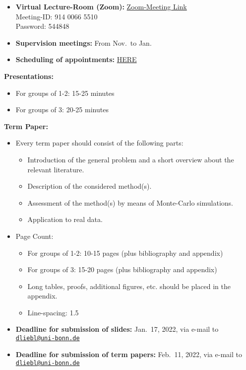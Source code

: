 \documentclass[
]{book}
\providecommand{\tightlist}{%
  \setlength{\itemsep}{0pt}\setlength{\parskip}{0pt}}
\begin{document}
\begin{itemize}
\item
  \textbf{Virtual Lecture-Room (Zoom):} \href{https://uni-bonn.zoom.us/j/91400665510?pwd=RUl5NW9mMjcyQlk2VkRGbXFrSmJlQT09}{Zoom-Meeting Link}\\
  Meeting-ID: 914 0066 5510\\
  Password: 544848
\item
  \textbf{Supervision meetings:} From Nov.~to Jan.~
\item
  \textbf{Scheduling of appointments:} \href{https://docs.google.com/spreadsheets/d/1clb0ple3GaRlwod5JOKK84A996p1BKNMSs32JrqBZ_A/edit?usp=sharing}{HERE}
\end{itemize}

\hfill\break

\textbf{Presentations:}

\begin{itemize}
\tightlist
\item
  For groups of 1-2: 15-25 minutes
\item
  For groups of 3: 20-25 minutes
\end{itemize}

\hfill\break

\textbf{Term Paper:}

\begin{itemize}
\tightlist
\item
  Every term paper should consist of the following parts:

  \begin{itemize}
  \tightlist
  \item
    Introduction of the general problem and a short overview about the relevant literature.
  \item
    Description of the considered method(s).
  \item
    Assessment of the method(s) by means of Monte-Carlo simulations.
  \item
    Application to real data.
  \end{itemize}
\item
  Page Count:

  \begin{itemize}
  \tightlist
  \item
    For groups of 1-2: 10-15 pages (plus bibliography and appendix)
  \item
    For groups of 3: 15-20 pages (plus bibliography and appendix)
  \item
    Long tables, proofs, additional figures, etc. should be placed in the appendix.
  \item
    Line-spacing: 1.5
  \end{itemize}
\item
  \textbf{Deadline for submission of slides:} Jan.~17, 2022, via e-mail to \href{mailto:dliebl@uni-bonn.de}{\nolinkurl{dliebl@uni-bonn.de}}\\
\item
  \textbf{Deadline for submission of term papers:} Feb.~11, 2022, via e-mail to \href{mailto:dliebl@uni-bonn.de}{\nolinkurl{dliebl@uni-bonn.de}}
\end{itemize}
\end{document}
